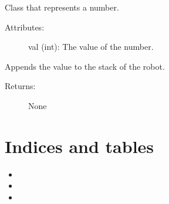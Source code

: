 \documentclass[letterpaper,10pt,english]{sphinxmanual}
\begin{document}
\begin{fulllineitems}
\label{\detokenize{expressions:robol_lang.expressions.NumberExp}}
\sphinxAtStartPar
Class that represents a number.
\begin{description}
\item[{Attributes:}] \leavevmode
\sphinxAtStartPar
val (int): The value of the number.

\end{description}

\begin{fulllineitems}
\label{\detokenize{expressions:robol_lang.expressions.NumberExp.interpret}}
\sphinxAtStartPar
Appends the value to the stack of the robot.
\begin{description}
\item[{Returns:}] \leavevmode
\sphinxAtStartPar
None

\end{description}

\end{fulllineitems}


\end{fulllineitems}



\chapter{Indices and tables}
\label{\detokenize{index:indices-and-tables}}\begin{itemize}
\item {} 
\sphinxAtStartPar
{}

\item {} 
\sphinxAtStartPar
{}

\item {} 
\sphinxAtStartPar
{}

\end{itemize}
\end{document}
